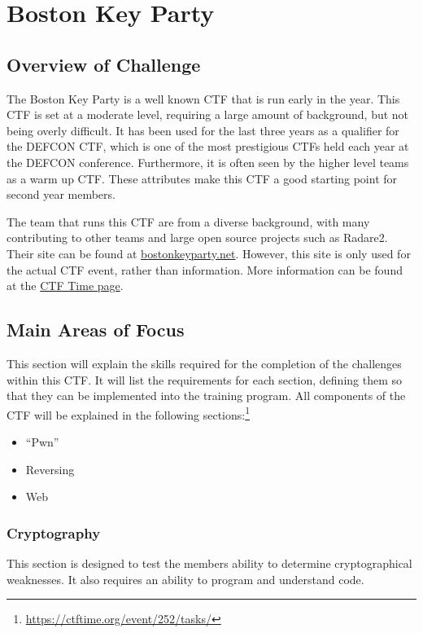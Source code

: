 \documentclass[a4paper,11pt]{report}
\begin{document}
\chapter{Boston Key Party}
	\section{Overview of Challenge}
		The Boston Key Party is a well known CTF that is run early in the year. 
		This CTF is set at a moderate level, requiring a large amount of background, but not being overly difficult. 
		It has been used for the last three years as a qualifier for the DEFCON CTF, 
		which is one of the most prestigious CTFs held each year at the DEFCON conference. 
		Furthermore, it is often seen by the higher level teams as a warm up CTF. 
		These attributes make this CTF a good starting point for second year members. 

		The team that runs this CTF are from a diverse background, with many contributing to other teams and large open source projects such as Radare2.
		Their site can be found at \href{https://web.archive.org/web/20160131055956/http://bostonkeyparty.net/}{bostonkeyparty.net}. 
		However, this site is only used for the actual CTF event, rather than information. 
		More information can be found at the \href{https://ctftime.org/event/252}{CTF Time page}.
	\section{Main Areas of Focus}
		This section will explain the skills required for the completion of the challenges within this CTF. 
		It will list the requirements for each section, defining them so that they can be implemented into the training program. 
		All components of the CTF will be explained in the following sections:\footnote{\url{https://ctftime.org/event/252/tasks/}}
		\begin{itemize}
			\item ``Pwn''
			\item Reversing
			\item Web
		\end{itemize}
		\subsection{Cryptography}
			This section is designed to test the members ability to determine cryptographical weaknesses. 
			It also requires an ability to program and understand code. 
			
\end{document}
